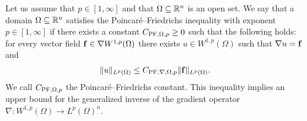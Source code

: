\documentclass[a4paper]{amsart}
\begin{document}
Let us assume that $p \in [1,\infty]$ and that $\Omega \subseteq {\mathbb R}^{n}$ is an open set. 
We say that a domain $\Omega \subseteq {\mathbb R}^{n}$ satisfies the Poincar\'e--Friedrichs inequality with exponent $p \in [1,\infty]$
if there exists a constant $C_{{\rm PF},\Omega,p} \geq 0$ such that the following holds:
for every vector field ${\mathbf f} \in \nabla W^{1,p}(\Omega)$ there exists $u \in W^{1,p}(\Omega)$
such that $\nabla u = {\mathbf f}$ and 
\begin{align}\label{math:inequalitypf:gradient}
    \| u \|_{L^{p}(\Omega)}
    \leq 
    C_{{\rm PF},\nabla,\Omega,p} 
    \| {\mathbf f} \|_{L^{p}(\Omega)}
    .
\end{align}
We call $C_{{\rm PF},\Omega,p}$ the Poincar\'e--Friedrichs constant. 
This inequality implies an upper bound for the generalized inverse of the gradient operator $\nabla : W^{1,p}(\Omega) \rightarrow L^{p}(\Omega)^{n}$.
\end{document}
